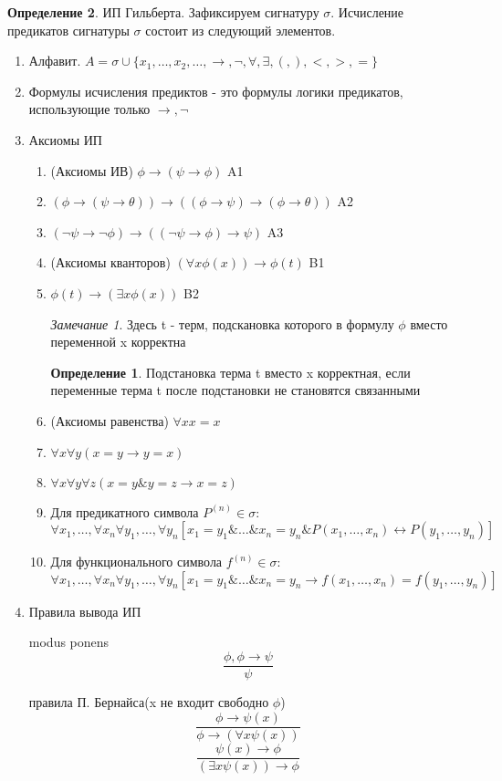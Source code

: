 \documentclass[a4paper]{article}
\theoremstyle{definition}
\newtheorem*{definition}{Определение}
\theoremstyle{remark}
\newtheorem*{remark}{Замечание}
\begin{document}
	\begin{definition}
		ИП Гильберта. 
		Зафиксируем сигнатуру $\sigma$. Исчисление предикатов сигнатуры $\sigma$ состоит из следующий элементов.
		\begin{enumerate}
			\item Алфавит. $A = \sigma \cup \{x_1, \dots, x_2, \dots, \rightarrow, \neg, \forall, \exists, (, ), <,> , =\}$
			\item Формулы исчисления предиктов - это формулы логики предикатов, использующие только $\to, \neg$
			\item Аксиомы ИП
			\begin{enumerate}
				\item (Аксиомы ИВ) $\phi \rightarrow (\psi \rightarrow\phi)$ A1
				\item $(\phi \rightarrow (\psi \rightarrow \theta)) \rightarrow ((\phi \rightarrow \psi) \rightarrow (\phi \rightarrow \theta))$ A2
				\item $(\neg \psi \rightarrow \neg \phi) \rightarrow ((\neg \psi \rightarrow \phi) \rightarrow \psi)$ A3
				\item (Аксиомы кванторов) $(\forall x \phi(x)) \rightarrow \phi(t)$ B1
				\item $\phi(t) \rightarrow (\exists x \phi(x))$ B2
				\begin{remark}
					Здесь t - терм, подскановка которого в формулу $\phi$ вместо переменной x корректна
				\end{remark}
                \begin{definition}
                    Подстановка терма t вместо x корректная, если переменные терма t после подстановки не становятся связанными
                \end{definition}
				\item (Аксиомы равенства) $\forall x x = x$
				\item $\forall x\forall y (x = y \rightarrow y = x)$
				\item $\forall x \forall y \forall z (x = y \& y = z \rightarrow x = z)$
				\item Для предикатного символа $P^{(n)} \in \sigma$: $$\forall x_1, \dots, \forall x_n \forall y_1, \dots, \forall y_n [x_1 = y_1 \& \dots \& x_n = y_n \& P(x_1, \dots, x_n) \leftrightarrow P(y_1, \dots, y_n)]$$
				\item Для функционального символа $f^{(n)} \in \sigma$: $$\forall x_1, \dots, \forall x_n \forall y_1, \dots, \forall y_n [x_1 = y_1 \& \dots \& x_n = y_n \to f(x_1, \dots, x_n) = f(y_1, \dots, y_n)]$$
			\end{enumerate}
			\item Правила вывода ИП

				modus ponens $$\frac{\phi, \phi \rightarrow \psi}{\psi}$$

				правила П. Бернайса(x не входит свободно $\phi$) $$\frac{\phi \rightarrow \psi(x)}{\phi \rightarrow (\forall x \psi(x))}$$ $$\frac{\psi(x) \rightarrow \phi}{(\exists x \psi(x)) \rightarrow \phi}$$
		\end{enumerate}
	\end{definition}
\end{document}
